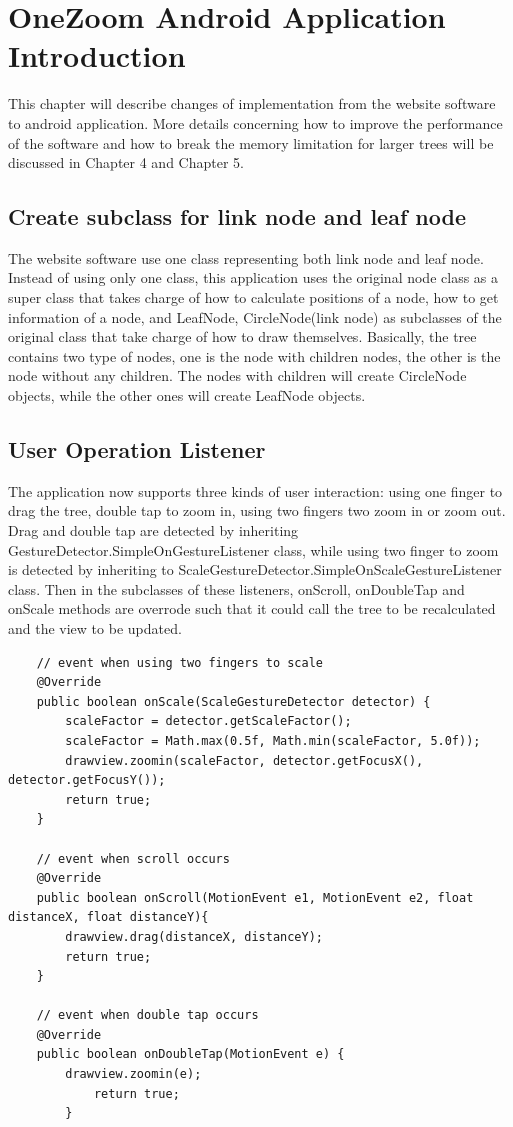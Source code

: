 \documentclass[MSc]{icldt}
\begin{document}
\chapter{OneZoom Android Application Introduction}

This chapter will describe changes of implementation from the website software to android application. More details concerning how to improve the performance of the software and how to break the memory limitation for larger trees will be discussed in Chapter 4 and Chapter 5.

\section{Create subclass for link node and leaf node}

The website software use one class representing both link node and leaf node. Instead of using only one class, this application uses the original node class as a super class that takes charge of how to calculate positions of a node, how to get information of a node, and LeafNode, CircleNode(link node) as subclasses of the original class that take charge of how to draw themselves. Basically, the tree contains two type of nodes, one is the node with children nodes, the other is the node without any children. The nodes with children will create CircleNode objects, while the other ones will create LeafNode objects. 

\section{User Operation Listener}

The application now supports three kinds of user interaction: using one finger to drag the tree, double tap to zoom in, using two fingers two zoom in or zoom out. Drag and double tap are detected by inheriting GestureDetector.SimpleOnGestureListener class, while using two finger to zoom is detected by inheriting to ScaleGestureDetector.SimpleOnScaleGestureListener class. Then in the subclasses of these listeners, onScroll, onDoubleTap and onScale methods are overrode such that it could call the tree to be recalculated and the view to be updated. 

\begin{lstlisting}
	// event when using two fingers to scale
	@Override
	public boolean onScale(ScaleGestureDetector detector) {
		scaleFactor = detector.getScaleFactor();
		scaleFactor = Math.max(0.5f, Math.min(scaleFactor, 5.0f));
		drawview.zoomin(scaleFactor, detector.getFocusX(), detector.getFocusY());
		return true;
	}
	
	// event when scroll occurs
	@Override
	public boolean onScroll(MotionEvent e1, MotionEvent e2, float distanceX, float distanceY){
		drawview.drag(distanceX, distanceY);
		return true;
	}
	
	// event when double tap occurs    
	@Override
	public boolean onDoubleTap(MotionEvent e) {
		drawview.zoomin(e);
    		return true;
        }

\end{lstlisting}
\end{document}
